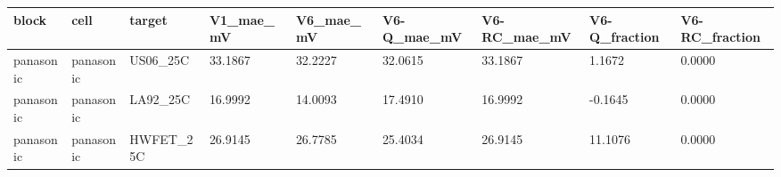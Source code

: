 \begin{tabular}{lllllllll}
\hline
block & cell & target & V1\_mae\_mV & V6\_mae\_mV & V6-Q\_mae\_mV & V6-RC\_mae\_mV & V6-Q\_fraction & V6-RC\_fraction \\
\hline
panasonic & panasonic & US06\_25C & 33.1867 & 32.2227 & 32.0615 & 33.1867 & 1.1672 & 0.0000 \\
panasonic & panasonic & LA92\_25C & 16.9992 & 14.0093 & 17.4910 & 16.9992 & -0.1645 & 0.0000 \\
panasonic & panasonic & HWFET\_25C & 26.9145 & 26.7785 & 25.4034 & 26.9145 & 11.1076 & 0.0000 \\
\hline
\end{tabular}

